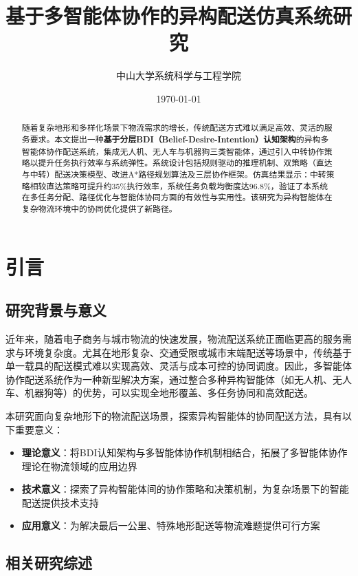 \documentclass[12pt,a4paper]{article}
\title{基于多智能体协作的异构配送仿真系统研究}
\author{中山大学系统科学与工程学院}
\date{\today}
\begin{document}
\maketitle

\begin{abstract}
随着复杂地形和多样化场景下物流需求的增长，传统配送方式难以满足高效、灵活的服务要求。本文提出一种\textbf{基于分层BDI（Belief-Desire-Intention）认知架构}的异构多智能体协作配送系统，集成无人机、无人车与机器狗三类智能体，通过引入中转协作策略以提升任务执行效率与系统弹性。系统设计包括规则驱动的推理机制、双策略（直达与中转）配送决策模型、改进A*路径规划算法及三层协作框架。仿真结果显示：中转策略相较直达策略可提升约35\%执行效率，系统任务负载均衡度达96.8\%，验证了本系统在多任务分配、路径优化与智能体协同方面的有效性与实用性。该研究为异构智能体在复杂物流环境中的协同优化提供了新路径。
\end{abstract}

\tableofcontents
\newpage

\section{引言}

\subsection{研究背景与意义}

近年来，随着电子商务与城市物流的快速发展，物流配送系统正面临更高的服务需求与环境复杂度。尤其在地形复杂、交通受限或城市末端配送等场景中，传统基于单一载具的配送模式难以实现高效、灵活与成本可控的协同调度。因此，多智能体协作配送系统作为一种新型解决方案，通过整合多种异构智能体（如无人机、无人车、机器狗等）的优势，可以实现全地形覆盖、多任务协同和高效配送。

本研究面向复杂地形下的物流配送场景，探索异构智能体的协同配送方法，具有以下重要意义：

\begin{itemize}
    \item \textbf{理论意义}：将BDI认知架构与多智能体协作机制相结合，拓展了多智能体协作理论在物流领域的应用边界
    \item \textbf{技术意义}：探索了异构智能体间的协作策略和决策机制，为复杂场景下的智能配送提供技术支持
    \item \textbf{应用意义}：为解决最后一公里、特殊地形配送等物流难题提供可行方案
\end{itemize}

\subsection{相关研究综述}
\end{document}
